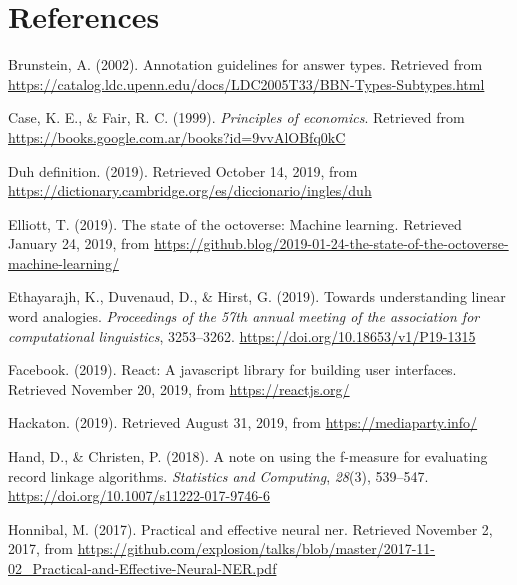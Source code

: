 \documentclass[12pt,a4paper,]{scrartcl}
\begin{document}
\newpage

\hypertarget{references}{%
\section*{References}\label{references}}

\hypertarget{refs}{}
\leavevmode\hypertarget{ref-brunstein2002}{}%
Brunstein, A. (2002). Annotation guidelines for answer types. Retrieved from \url{https://catalog.ldc.upenn.edu/docs/LDC2005T33/BBN-Types-Subtypes.html}

\leavevmode\hypertarget{ref-lawOfDiminishingReturns}{}%
Case, K. E., \& Fair, R. C. (1999). \emph{Principles of economics}. Retrieved from \url{https://books.google.com.ar/books?id=9vvAlOBfq0kC}

\leavevmode\hypertarget{ref-cambridge_duh}{}%
Duh definition. (2019). Retrieved October 14, 2019, from \url{https://dictionary.cambridge.org/es/diccionario/ingles/duh}

\leavevmode\hypertarget{ref-github_machine_learning}{}%
Elliott, T. (2019). The state of the octoverse: Machine learning. Retrieved January 24, 2019, from \url{https://github.blog/2019-01-24-the-state-of-the-octoverse-machine-learning/}

\leavevmode\hypertarget{ref-ethayarajh-etal-2019-towards}{}%
Ethayarajh, K., Duvenaud, D., \& Hirst, G. (2019). Towards understanding linear word analogies. \emph{Proceedings of the 57th annual meeting of the association for computational linguistics}, 3253--3262. \url{https://doi.org/10.18653/v1/P19-1315}

\leavevmode\hypertarget{ref-react}{}%
Facebook. (2019). React: A javascript library for building user interfaces. Retrieved November 20, 2019, from \url{https://reactjs.org/}

\leavevmode\hypertarget{ref-hackaton2019}{}%
Hackaton. (2019). Retrieved August 31, 2019, from \url{https://mediaparty.info/}

\leavevmode\hypertarget{ref-pub_1084928040}{}%
Hand, D., \& Christen, P. (2018). A note on using the f-measure for evaluating record linkage algorithms. \emph{Statistics and Computing}, \emph{28}(3), 539--547. \url{https://doi.org/10.1007/s11222-017-9746-6}

\leavevmode\hypertarget{ref-honnibal_NER}{}%
Honnibal, M. (2017). Practical and effective neural ner. Retrieved November 2, 2017, from \url{https://github.com/explosion/talks/blob/master/2017-11-02_Practical-and-Effective-Neural-NER.pdf}
\end{document}
